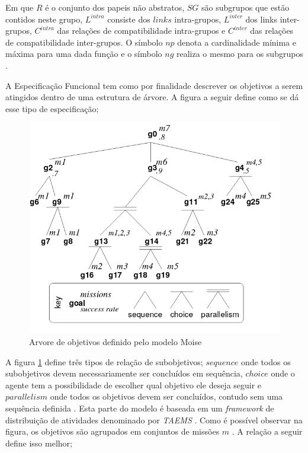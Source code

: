 Em que $R$ é o conjunto dos papeis não abstratos, $SG$ são subgrupos que estão contidos neste grupo, $L^{intra}$ consiste dos $links$ intra-grupos, $L^{inter}$ dos links inter-grupos, 
$C^{intra}$ das relações de compatibilidade intra-grupos e $C^{inter}$ das relações de compatibilidade inter-grupos. O símbolo $np$ denota a cardinalidade mínima e máxima para uma dada 
função e o símbolo $ng$ realiza o mesmo para os subgrupos \cite{moiseframework}. 

A Especificação Funcional tem como por finalidade descrever os objetivos a serem atingidos dentro de uma estrutura de árvore. A figura a seguir define como se dá esse tipo de especificação; 

\begin{figure}[H]
  \centering
  \includegraphics[width=0.8\linewidth]{figure/figmoise} 
  \caption{Arvore de objetivos definido pelo modelo Moise \cite{moiseframework}}
  \label{arvoremoise}
\end{figure}

A figura \ref{arvoremoise} define três tipos de relação de subobjetivos; $sequence$ onde todos os subobjetivos devem necessariamente ser concluídos em sequência, $choice$ onde o agente tem a 
possibilidade de escolher qual objetivo ele deseja seguir e $parallelism$ onde todos os objetivos devem ser concluídos, contudo sem uma sequência definida \cite{taems01} \cite{taems02}. Esta
parte do modelo é baseada em um \textit{framework} de distribuição de atividades denominado por \textit{TAEMS} \cite{TAEMS}.
Como é possível observar na figura, os objetivos são agrupados em conjuntos de missões $m$ \cite{dynamicagenttemporalstruct}. A relação a seguir define isso melhor;

